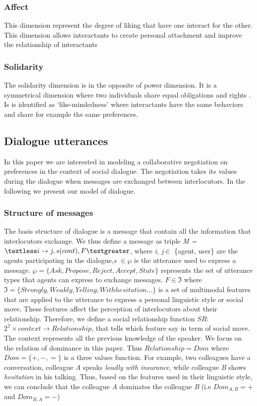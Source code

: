 \documentclass{llncs}
\begin{document}
\subsubsection{Affect}
This dimension represent the degree of liking that have one interact for the other. This dimension allows interactants to create personal attachment and improve the relationship of interactants \cite{nicholson2001role}
\subsubsection{Solidarity}
The solidarity dimension is in the opposite of power dimension. It is a symmetrical dimension where two individuals share equal obligations and rights \cite{svennevig2000getting}. Is is identified as ‘like-mindedness’ \cite{bickmore2005establishing} where interactants have the same behaviors and share for example the same preferences.
\subsection{Dialogue utterances}
In this paper we are interested in  modeling a collaborative negotiation on preferences in the context of social dialogue. The negotiation takes its values during the dialogue when messages are exchanged between interlocutors. In the following we present our model of dialogue.
\subsubsection{Structure of messages}
The basis structure of dialogue is a message that contain all the information that interlocutors exchange. We thus define a message as triple \emph{M = $\textless i \rightarrow j, s(cont), F  \textgreater$}, where \emph{i, j}$\in$ \{agent, user\} are the agents participating in the dialogue,\emph{s $\in \wp$}  is the utterance used to express a message. $\wp = \{ Ask, Propose, Reject, Accept, State\}$  represents the set of utterance types \cite{searle1969speech} that agents can express to exchange messages. 
 $F \in \Im $  where $\Im = \{ Strongly, Weakly, Yelling, With hesitation ...\}$ is a set of multimodal features that are applied to the utterance to express a personal linguistic style or social move. These features affect the perception of interlocutors about their relationship. Therefore, we define a social relationship function $SR$: $2^\Im  \times context \rightarrow Relationship $, that tells which feature say in term of social move. The context represents all the previous knowledge of the speaker. We focus on the relation of dominance in this paper. Thus $Relationship = Dom$ where  $Dom = \{+, -, =\}$ is a three values function. For example, two colleagues have a conversation, colleague \emph{A} speaks \textit{loudly with insurance}, while colleague \emph{B} shows \textit{hesitation} in his talking. Thus, based on the features used in their linguistic style, we can conclude that the colleague \emph{A}  dominates  the colleague \emph{B} (i.e $Dom_{A,B} = +$ and $Dom_{B,A} = -$)
 
\end{document}
